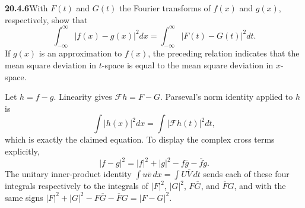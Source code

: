 \par\bigskip
\noindent\textbf{20.4.6}\quad With $F(t)$ and $G(t)$ the Fourier
transforms of $f(x)$ and $g(x)$, respectively, show that
\[
\int_{-\infty}^{\infty}\big|f(x)-g(x)\big|^{2}dx
=\int_{-\infty}^{\infty}\big|F(t)-G(t)\big|^{2}dt.
\]
If $g(x)$ is an approximation to $f(x)$, the preceding relation
indicates that the mean square deviation in $t$-space is equal to
the mean square deviation in $x$-space.
\par{}
\solution
Let $h=f-g$. Linearity gives
$\mathcal Fh=F-G$. Parseval's norm identity applied to $h$ is
\[
\int|h(x)|^2dx=\int|\mathcal Fh(t)|^2dt,
\]
which is exactly the claimed equation. To display the complex
cross terms explicitly,
\[
|f-g|^2=|f|^2+|g|^2-f\overline g-\overline f g.
\]
The unitary inner-product identity
$\int u\overline v\,dx=\int U\overline V\,dt$ sends each of these
four integrals respectively to the integrals of $|F|^2$, $|G|^2$,
$F\overline G$, and $\overline F G$, and with the same signs
$|F|^2+|G|^2-F\overline G-\overline FG=|F-G|^2$.

